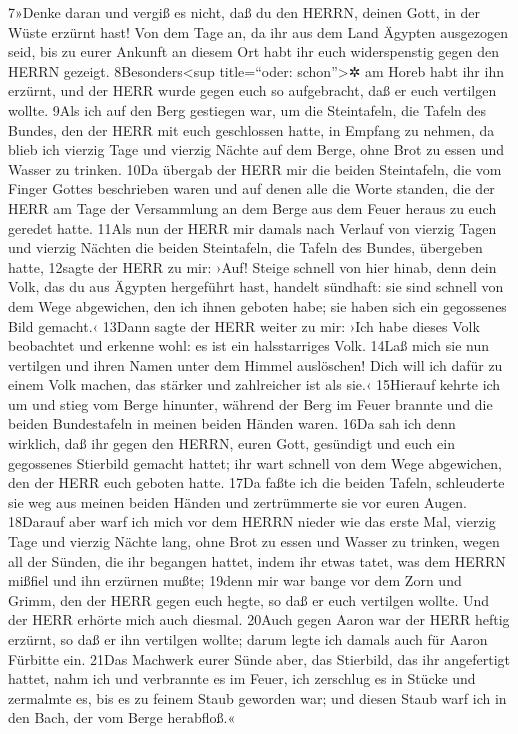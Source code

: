 7»Denke daran und vergiß es nicht, daß du den HERRN, deinen Gott, in der
Wüste erzürnt hast! Von dem Tage an, da ihr aus dem Land Ägypten
ausgezogen seid, bis zu eurer Ankunft an diesem Ort habt ihr euch
widerspenstig gegen den HERRN gezeigt. 8Besonders\textless sup
title=``oder: schon''\textgreater✲ am Horeb habt ihr ihn erzürnt, und
der HERR wurde gegen euch so aufgebracht, daß er euch vertilgen wollte.
9Als ich auf den Berg gestiegen war, um die Steintafeln, die Tafeln des
Bundes, den der HERR mit euch geschlossen hatte, in Empfang zu nehmen,
da blieb ich vierzig Tage und vierzig Nächte auf dem Berge, ohne Brot zu
essen und Wasser zu trinken. 10Da übergab der HERR mir die beiden
Steintafeln, die vom Finger Gottes beschrieben waren und auf denen alle
die Worte standen, die der HERR am Tage der Versammlung an dem Berge aus
dem Feuer heraus zu euch geredet hatte. 11Als nun der HERR mir damals
nach Verlauf von vierzig Tagen und vierzig Nächten die beiden
Steintafeln, die Tafeln des Bundes, übergeben hatte, 12sagte der HERR zu
mir: ›Auf! Steige schnell von hier hinab, denn dein Volk, das du aus
Ägypten hergeführt hast, handelt sündhaft: sie sind schnell von dem Wege
abgewichen, den ich ihnen geboten habe; sie haben sich ein gegossenes
Bild gemacht.‹ 13Dann sagte der HERR weiter zu mir: ›Ich habe dieses
Volk beobachtet und erkenne wohl: es ist ein halsstarriges Volk. 14Laß
mich sie nun vertilgen und ihren Namen unter dem Himmel auslöschen! Dich
will ich dafür zu einem Volk machen, das stärker und zahlreicher ist als
sie.‹ 15Hierauf kehrte ich um und stieg vom Berge hinunter, während der
Berg im Feuer brannte und die beiden Bundestafeln in meinen beiden
Händen waren. 16Da sah ich denn wirklich, daß ihr gegen den HERRN, euren
Gott, gesündigt und euch ein gegossenes Stierbild gemacht hattet; ihr
wart schnell von dem Wege abgewichen, den der HERR euch geboten hatte.
17Da faßte ich die beiden Tafeln, schleuderte sie weg aus meinen beiden
Händen und zertrümmerte sie vor euren Augen. 18Darauf aber warf ich mich
vor dem HERRN nieder wie das erste Mal, vierzig Tage und vierzig Nächte
lang, ohne Brot zu essen und Wasser zu trinken, wegen all der Sünden,
die ihr begangen hattet, indem ihr etwas tatet, was dem HERRN mißfiel
und ihn erzürnen mußte; 19denn mir war bange vor dem Zorn und Grimm, den
der HERR gegen euch hegte, so daß er euch vertilgen wollte. Und der HERR
erhörte mich auch diesmal. 20Auch gegen Aaron war der HERR heftig
erzürnt, so daß er ihn vertilgen wollte; darum legte ich damals auch für
Aaron Fürbitte ein. 21Das Machwerk eurer Sünde aber, das Stierbild, das
ihr angefertigt hattet, nahm ich und verbrannte es im Feuer, ich
zerschlug es in Stücke und zermalmte es, bis es zu feinem Staub geworden
war; und diesen Staub warf ich in den Bach, der vom Berge herabfloß.«

